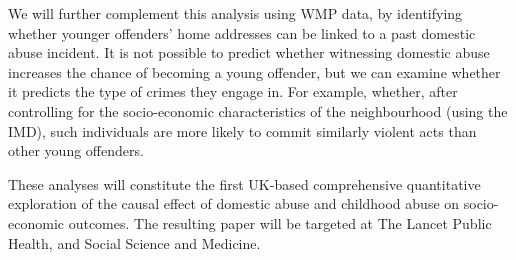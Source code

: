 \documentclass[11pt, a4paper]{article}
\begin{document}





We will further complement this analysis using WMP data, by identifying whether younger offenders' home addresses can be linked to a past domestic abuse incident. It is not possible to predict whether witnessing domestic abuse increases the chance of becoming a young offender, but we can examine whether it predicts the type of crimes they engage in. For example, whether, after controlling for the socio-economic characteristics of the neighbourhood (using the IMD), such individuals are more likely to commit similarly violent acts than other young offenders.


 These analyses will constitute the first UK-based comprehensive quantitative exploration of the causal effect of domestic abuse and childhood abuse on socio-economic outcomes. The resulting paper will be targeted at The Lancet Public Health, and Social Science and Medicine.


%
%
%
%
%
%
%
%
\end{document}
